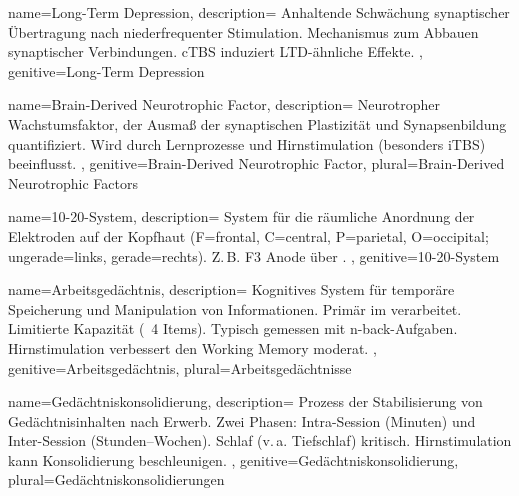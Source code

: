 
{
	name=Long-Term Depression,
	description={
			Anhaltende Schwächung synaptischer Übertragung nach niederfrequenter Stimulation. Mechanismus zum Abbauen synaptischer Verbindungen. \gls{cTBS} induziert LTD-ähnliche Effekte. \cite{esser_level_2006}\newline
		},
	genitive=Long-Term Depression
}


{
	name=Brain-Derived Neurotrophic Factor,
	description={
			Neurotropher Wachstumsfaktor, der Ausmaß der synaptischen Plastizität und Synapsenbildung quantifiziert. Wird durch Lernprozesse und Hirnstimulation (besonders \gls{iTBS}) beeinflusst. \cite{cavaleiro_memory_2020}
		},
	genitive=Brain-Derived Neurotrophic Factor,
	plural=Brain-Derived Neurotrophic Factors
}



{
	name=10-20-System,
	description={
			System für die räumliche Anordnung der Elektroden auf der Kopfhaut (F=frontal, C=central, P=parietal, O=occipital; ungerade=links, gerade=rechts). Z.\,B. F3 Anode über . \cite{woods_technical_2016, caulfield_optimized_2022}
		},
	genitive=10-20-System
}


{
	name=Arbeitsgedächtnis,
	description={
			Kognitives System für temporäre Speicherung und Manipulation von Informationen. Primär im  verarbeitet. Limitierte Kapazität (~4 Items). Typisch gemessen mit n-back-Aufgaben. Hirnstimulation verbessert den Working Memory moderat. \cite{hoy_enhancement_2016, senkowski_boosting_2022}
		},
	genitive=Arbeitsgedächtnis,
	plural=Arbeitsgedächtnisse
}

{
	name=Gedächtniskonsolidierung,
	description={
			Prozess der Stabilisierung von Gedächtnisinhalten nach Erwerb. Zwei Phasen: Intra-Session (Minuten) und Inter-Session (Stunden--Wochen). Schlaf (v.\,a. Tiefschlaf) kritisch. Hirnstimulation kann Konsolidierung beschleunigen. \cite{reis_noninvasive_2009}
		},
	genitive=Gedächtniskonsolidierung,
	plural=Gedächtniskonsolidierungen
}

